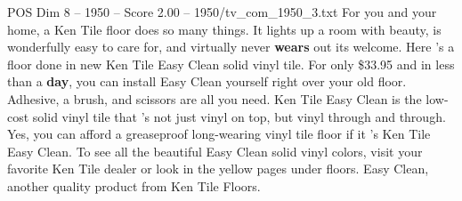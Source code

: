 \begin{textsample}{POS Dim 8 – 1950 – Score 2.00 – 1950/tv\_com\_1950\_3.txt}  \label{ex:f8_pos_007}
For you and your home, a Ken Tile floor does so many things.
It lights up a room with beauty, is wonderfully easy to care for, and virtually never \textbf{wears} out its welcome.
Here 's a floor done in new Ken Tile Easy Clean solid vinyl tile.
For only \$33.95 and in less than a \textbf{day}, you can install Easy Clean yourself right over your old floor.
Adhesive, a brush, and scissors are all you need.
Ken Tile Easy Clean is the low-cost solid vinyl tile that 's not just vinyl on top, but vinyl through and through.
Yes, you can afford a greaseproof long-wearing vinyl tile floor if it 's Ken Tile Easy Clean.
To see all the beautiful Easy Clean solid vinyl colors, visit your favorite Ken Tile dealer or look in the yellow pages under floors.
Easy Clean, another quality product from Ken Tile Floors.

\end{textsample}
